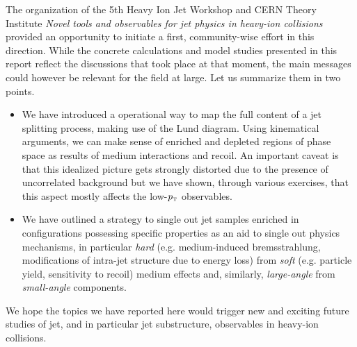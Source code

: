 The organization of the 5th Heavy Ion Jet Workshop and CERN Theory Institute {\sl Novel tools and observables for jet physics in heavy-ion collisions} provided an opportunity to initiate a first, community-wise effort in this direction.
While the concrete calculations and model studies presented in this report reflect the discussions that took place at that moment, the main messages could however be relevant for the field at large. Let us summarize them in two points.
\begin{itemize}

\item We have introduced a operational way to map the full content of a jet splitting process, making use of the Lund diagram. Using kinematical arguments, we can make sense of enriched and depleted regions of phase space as results of medium interactions and recoil. An important caveat is that this idealized picture gets strongly distorted due to the presence of uncorrelated background but we have shown, through various exercises, that this aspect mostly affects the low-$p_{\text{\tiny T}}$ observables.

\item We have outlined a strategy to single out jet samples enriched in configurations possessing specific properties as an aid to single out physics mechanisms, in particular \textsl{hard} (e.g. medium-induced bremsstrahlung, modifications of intra-jet structure due to energy loss) from \textsl{soft} (e.g. particle yield, sensitivity to recoil) medium effects and, similarly, \textsl{large-angle} from \textsl{small-angle} components.

\end{itemize}
We hope the topics we have reported here would trigger new and exciting future studies of jet, and in particular jet substructure, observables in heavy-ion collisions.


